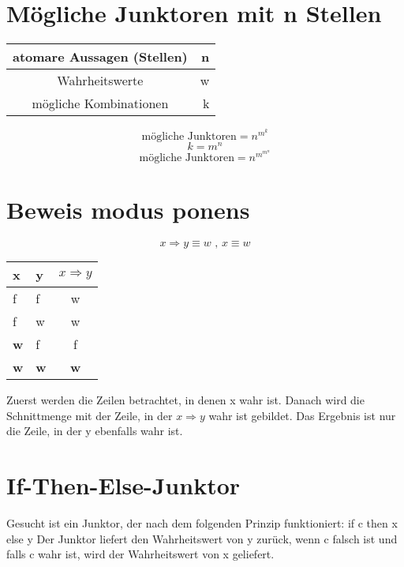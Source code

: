 \documentclass[a4paper]{article}
\begin{document}
	\section{Mögliche Junktoren mit n Stellen}
	
	\begin{center}
		\begin{tabular}{|c|r|}
			\firsthline
				atomare Aussagen (Stellen) & n \\
			\hline
				Wahrheitswerte & w \\
			\hline
				mögliche Kombinationen & k \\
			\hline
		\end{tabular}
	\end{center}
	
	\begin{equation*}
		\text{mögliche Junktoren} = n^{m^{k}}
	\end{equation*}
	\begin{equation*}
		k = m^{n}
	\end{equation*}
	\begin{equation*}
		\text{mögliche Junktoren} = n^{m^{m^{n}}}
	\end{equation*}
	
	\section{Beweis modus ponens}
	\begin{equation*}
		x \Rightarrow y \equiv w \text{ , } x \equiv w 
	\end{equation*}
	
	\begin{center}
		\begin{tabular}{|l|l|c|}
			\firsthline
				x & y & $x \Rightarrow y$ \\
			\hline
				f & f & w \\
				f & w & w \\
				\textbf{w} & f & f \\
				\textbf{w} & \textbf{w} & \textbf{w} \\
			\hline
		\end{tabular}
	\end{center}
	
	Zuerst werden die Zeilen betrachtet, in denen x wahr ist. Danach wird die Schnittmenge mit der Zeile, in der $x \Rightarrow y$ wahr ist gebildet. Das Ergebnis ist nur die Zeile, in der y ebenfalls wahr ist.
	
	\section{If-Then-Else-Junktor}
	Gesucht ist ein Junktor, der nach dem folgenden Prinzip funktioniert: if c then x else y
	\newline
	Der Junktor liefert den Wahrheitswert von y zurück, wenn c falsch ist und falls c wahr ist, wird der Wahrheitswert von x geliefert.
	
\end{document}
